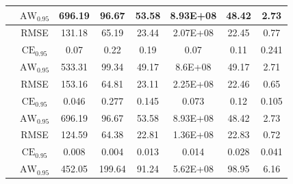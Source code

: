 \documentclass[letterpaper]{article} %
\begin{document}
\begin{table}[t]
\begin{tabular}{|c|c|c|c|c|c|c|c|}
        \rule{0pt}{2ex}
		& $\text{AW}_{0.95}$ & \cellcolor{gray!5}696.19 & \cellcolor{gray!10}96.67 & \cellcolor{gray!15}53.58 & \cellcolor{gray!20}8.93E+08 & \cellcolor{gray!25}48.42 & \cellcolor{gray!30}2.73 \\ \hline \hline
        \rule{0pt}{2ex}
		\multirow{3}{*}{Quantile Estimator} & RMSE & \cellcolor{gray!5}131.18 & \cellcolor{gray!10}65.19 & \cellcolor{gray!15}23.44 & \cellcolor{gray!20}2.07E+08 & \cellcolor{gray!25}22.45 & \cellcolor{gray!30}0.77 \\
        \rule{0pt}{2ex}
		& $\text{CE}_{0.95}$ & \cellcolor{gray!5}0.07 & \cellcolor{gray!10}0.22 & \cellcolor{gray!15}0.19 &\cellcolor{gray!20} 0.07 & \cellcolor{gray!25}0.11 & \cellcolor{gray!30}0.241 \\
        \rule{0pt}{2ex}
		& $\text{AW}_{0.95}$ & \cellcolor{gray!5}533.31 & \cellcolor{gray!10}99.34 & \cellcolor{gray!15}49.17 & \cellcolor{gray!20}8.6E+08 & \cellcolor{gray!25}49.17 & \cellcolor{gray!30}2.71 \\ \hline \hline
        \rule{0pt}{2ex}
		\multirow{3}{*}{BNN} & RMSE & \cellcolor{gray!5}153.16 & \cellcolor{gray!10}64.81 & \cellcolor{gray!15}23.11 & \cellcolor{gray!20}2.25E+08 & \cellcolor{gray!25}22.46 & \cellcolor{gray!30}0.65 \\
        \rule{0pt}{2ex}
		& $\text{CE}_{0.95}$ & \cellcolor{gray!5}0.046 & \cellcolor{gray!10}0.277 & \cellcolor{gray!15}0.145 &\cellcolor{gray!20} 0.073 & \cellcolor{gray!25}0.12 & \cellcolor{gray!30}0.105 \\
        \rule{0pt}{2ex}
		& $\text{AW}_{0.95}$ & \cellcolor{gray!5}696.19 & \cellcolor{gray!10}96.67 & \cellcolor{gray!15}53.58 & \cellcolor{gray!20}8.93E+08 & \cellcolor{gray!25}48.42 & \cellcolor{gray!30}2.73 \\ \hline \hline
        \rule{0pt}{2ex}
		\multirow{3}{*}{ HNN } & RMSE & \cellcolor{gray!5}124.59 & \cellcolor{gray!10}64.38 & \cellcolor{gray!15}22.81 & \cellcolor{gray!20}1.36E+08 & \cellcolor{gray!25}22.83 & \cellcolor{gray!30}0.72 \\
        \rule{0pt}{2ex}
		& $\text{CE}_{0.95}$ & \cellcolor{gray!5}0.008 & \cellcolor{gray!10}0.004 & \cellcolor{gray!15}0.013 & \cellcolor{gray!20}0.014 &\cellcolor{gray!25} 0.028 & \cellcolor{gray!30}0.041 \\
        \rule{0pt}{2ex}
		& $\text{AW}_{0.95}$ & \cellcolor{gray!5}452.05 & \cellcolor{gray!10}199.64 & \cellcolor{gray!15}91.24 & \cellcolor{gray!20}5.62E+08 & \cellcolor{gray!25}98.95 & \cellcolor{gray!30}6.16 \\\hline \hline


\end{tabular}
\end{table}
\end{document}

